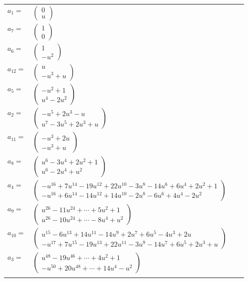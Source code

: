 \documentclass[1p]{elsarticle_modified}
\theoremstyle{definition}
\begin{document}
\begin{tabular}{m{7pt} m{180pt} m{7pt} m{180pt} }
\flushright $a_{1}=$&$\begin{pmatrix}0\\u\end{pmatrix}$ \\
\flushright $a_{7}=$&$\begin{pmatrix}1\\0\end{pmatrix}$ \\
\flushright $a_{6}=$&$\begin{pmatrix}1\\- u^2\end{pmatrix}$ \\
\flushright $a_{12}=$&$\begin{pmatrix}u\\- u^3+u\end{pmatrix}$ \\
\flushright $a_{5}=$&$\begin{pmatrix}- u^2+1\\u^4-2 u^2\end{pmatrix}$ \\
\flushright $a_{2}=$&$\begin{pmatrix}- u^5+2 u^3- u\\u^7-3 u^5+2 u^3+u\end{pmatrix}$ \\
\flushright $a_{11}=$&$\begin{pmatrix}- u^3+2 u\\- u^3+u\end{pmatrix}$ \\
\flushright $a_{8}=$&$\begin{pmatrix}u^6-3 u^4+2 u^2+1\\u^6-2 u^4+u^2\end{pmatrix}$ \\
\flushright $a_{4}=$&$\begin{pmatrix}- u^{16}+7 u^{14}-19 u^{12}+22 u^{10}-3 u^8-14 u^6+6 u^4+2 u^2+1\\- u^{16}+6 u^{14}-14 u^{12}+14 u^{10}-2 u^8-6 u^6+4 u^4-2 u^2\end{pmatrix}$ \\
\flushright $a_{9}=$&$\begin{pmatrix}u^{26}-11 u^{24}+\cdots+5 u^2+1\\u^{26}-10 u^{24}+\cdots-8 u^4+u^2\end{pmatrix}$ \\
\flushright $a_{10}=$&$\begin{pmatrix}u^{15}-6 u^{13}+14 u^{11}-14 u^9+2 u^7+6 u^5-4 u^3+2 u\\- u^{17}+7 u^{15}-19 u^{13}+22 u^{11}-3 u^9-14 u^7+6 u^5+2 u^3+u\end{pmatrix}$ \\
\flushright $a_{3}=$&$\begin{pmatrix}u^{48}-19 u^{46}+\cdots+4 u^2+1\\- u^{50}+20 u^{48}+\cdots+14 u^4- u^2\end{pmatrix}$\\&\end{tabular}
\end{document}
